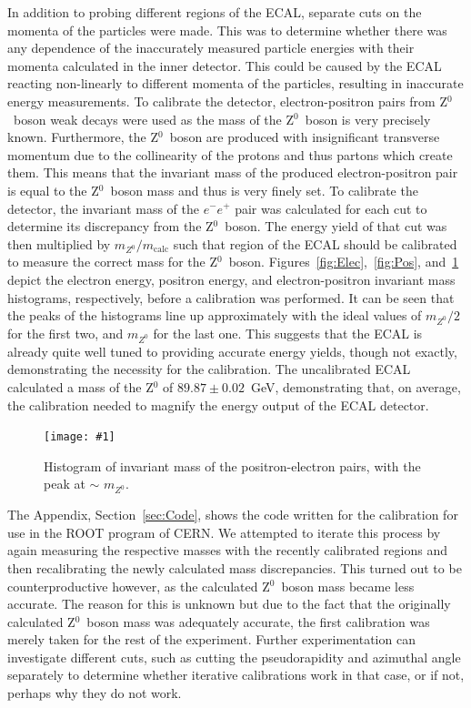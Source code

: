 \documentclass[twocolumn]{article}
\newcommand{\insertFigure}[1]{%
   \texttt{[image: \#1]}%
}
\begin{document}
\par In addition to probing different regions of the ECAL, separate cuts on the momenta of the particles were made. This was to determine whether there was any dependence of the inaccurately measured particle energies with their momenta calculated in the inner detector. This could be caused by the ECAL reacting non-linearly to different momenta of the particles, resulting in inaccurate energy measurements. To calibrate the detector, electron-positron pairs from Z$^0$~boson weak decays were used as the mass of the Z$^0$~boson is very precisely known. Furthermore, the Z$^0$~boson are produced with insignificant transverse momentum due to the collinearity of the protons and thus partons which create them. This means that the invariant mass of the produced electron-positron pair is equal to the Z$^0$~boson mass and thus is very finely set. To calibrate the detector, the invariant mass of the $e^-e^+$ pair was calculated for each cut to determine its discrepancy from the Z$^0$~boson. The energy yield of that cut was then multiplied by $m_{Z^0}/m_{\text{calc}}$ such that region of the ECAL should be calibrated to measure the correct mass for the Z$^0$~boson. Figures~\ref{fig:Elec},~\ref{fig:Pos}, and~\ref{fig:Inv} depict the electron energy, positron energy, and electron-positron invariant mass histograms, respectively, before a calibration was performed. It can be seen that the peaks of the histograms line up approximately with the ideal values of $m_{Z^0}/2$ for the first two, and $m_{Z^0}$ for the last one. This suggests that the ECAL is already quite well tuned to providing accurate energy yields, though not exactly, demonstrating the necessity for the calibration. The uncalibrated ECAL calculated a mass of the Z$^0$ of $89.87 
\pm 0.02$~GeV, demonstrating that, on average, the calibration needed to magnify the energy output of the ECAL detector.\\
\begin{figure} [!h]
	\centering
	\insertFigure{Images/InvMass.png}
	\caption{Histogram of invariant mass of the positron-electron pairs, with the peak at $\sim$ $m_{Z^0}$.}
	\label{fig:Inv}
\end{figure}
\par The Appendix, Section~\ref{sec:Code}, shows the code written for the calibration for use in the ROOT program of CERN. We attempted to iterate this process by again measuring the respective masses with the recently calibrated regions and then recalibrating the newly calculated mass discrepancies. This turned out to be counterproductive however, as the calculated Z$^0$~boson mass became less accurate. The reason for this is unknown but due to the fact that the originally calculated Z$^0$~boson mass was adequately accurate, the first calibration was merely taken for the rest of the experiment. Further experimentation can investigate different cuts, such as cutting the pseudorapidity and azimuthal angle separately to determine whether iterative calibrations work in that case, or if not, perhaps why they do not work. \\
\end{document}
